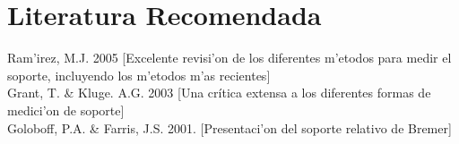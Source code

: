 \section{Literatura Recomendada}
Ram'irez, M.J. 2005
[Excelente revisi'on de los diferentes m'etodos para medir el soporte, incluyendo los m'etodos m'as recientes]\\
Grant, T. \& Kluge. A.G. 2003
[Una cr\'itica extensa a los diferentes formas de medici'on de soporte]\\
Goloboff, P.A. \& Farris, J.S. 2001.
[Presentaci'on del soporte relativo de Bremer]